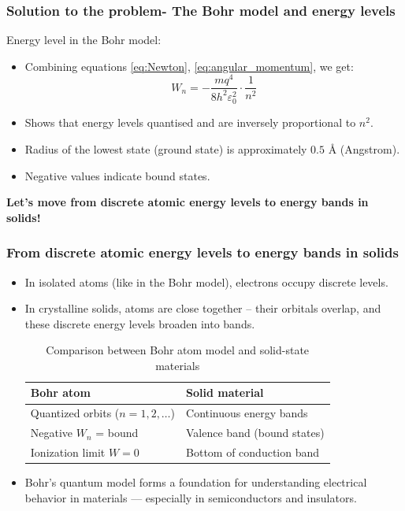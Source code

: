\begin{frame}
	\frametitle{Solution to the problem- The Bohr model and energy levels}
    Energy level in the Bohr model:
    \begin{itemize}
        \item Combining equations \ref{eq:Newton}, \ref{eq:angular_momentum}, we get:
        \begin{equation}
        W_n = -\frac{m q^4}{8 h^2 \varepsilon_0^2} \cdot \frac{1}{n^2}
        \end{equation}
        \item Shows that energy levels quantised and are inversely proportional to $n^2$.
        \item Radius of the lowest state (ground state) is approximately $0.5$ Å (Angstrom).
        \item Negative values indicate bound states.
    \end{itemize}
\textbf{Let's move from discrete atomic energy levels to energy bands in solids!}
\end{frame}

\begin{frame}
	\frametitle{From discrete atomic energy levels to energy bands in solids}
    \begin{itemize}
        \item In isolated atoms (like in the Bohr model), electrons occupy discrete levels.
        \item In crystalline solids, atoms are close together -- their orbitals overlap, and these discrete energy levels broaden into bands.
    \begin{table}[h!]
        \centering
        \begin{tabular}{|l|l|}
        \hline
        \textbf{Bohr atom} & \textbf{Solid material} \\
        \hline
        Quantized orbits ($n = 1,2,\ldots$) & Continuous energy bands \\
        \hline
        Negative $W_n$ = bound & Valence band (bound states) \\
        \hline
        Ionization limit $W = 0$ & Bottom of conduction band \\
        \hline
        \end{tabular}
        \caption{Comparison between Bohr atom model and solid-state materials}
        \end{table}
        \item Bohr's quantum model forms a foundation for understanding electrical behavior in materials — especially in semiconductors and insulators.
    \end{itemize}
\end{frame}

